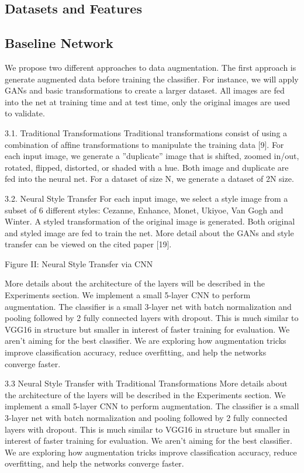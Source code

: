 \documentclass[a4paper,11pt]{article}
\begin{document}
\subsection{Datasets and Features} 
\subsection{Baseline Network}
We propose two different approaches to data augmentation. The ﬁrst approach is generate augmented data before training the classiﬁer. For instance, we will apply GANs and basic transformations to create a larger dataset. All images are fed into the net at training time and at test time, only the original images are used to validate. 

3.1. Traditional Transformations
Traditional transformations consist of using a combination of afﬁne transformations to manipulate the training data [9]. For each input image, we generate a ”duplicate” image that is shifted, zoomed in/out, rotated, ﬂipped, distorted, or shaded with a hue. Both image and duplicate are fed into the neural net. For a dataset of size N, we generate a dataset of 2N size.

3.2. Neural Style Transfer
For each input image, we select a style image from a subset of 6 different styles: Cezanne, Enhance, Monet, Ukiyoe, Van Gogh and Winter. A styled transformation of the original image is generated. Both original and styled image are fed to train the net. More detail about the GANs and style transfer can be viewed on the cited paper [19].

Figure II: Neural Style Transfer via CNN

More details about the architecture of the layers will be described in the Experiments section. We implement a small 5-layer CNN to perform augmentation. The classiﬁer is a small 3-layer net with batch normalization and pooling followed by 2 fully connected layers with dropout. This is much similar to VGG16 in structure but smaller in interest of faster training for evaluation. We aren’t aiming for the best classiﬁer. We are exploring how augmentation tricks improve classiﬁcation accuracy, reduce overﬁtting, and help the networks converge faster.

3.3 Neural Style Transfer with Traditional Transformations
More details about the architecture of the layers will be described in the Experiments section. We implement a small 5-layer CNN to perform augmentation. The classiﬁer is a small 3-layer net with batch normalization and pooling followed by 2 fully connected layers with dropout. This is much similar to VGG16 in structure but smaller in interest of faster training for evaluation. We aren’t aiming for the best classiﬁer. We are exploring how augmentation tricks improve classiﬁcation accuracy, reduce overﬁtting, and help the networks converge faster.
\end{document}
